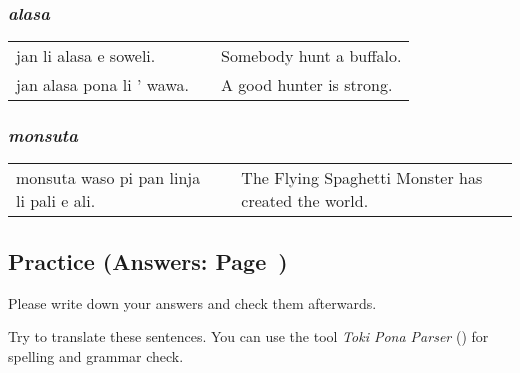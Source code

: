 \subsubsection*{\textit{alasa}}
\begin{supertabular}{p{5,5cm}|ll}
jan li alasa e soweli. && Somebody hunt a buffalo. \\
jan alasa pona li ' wawa. && A good hunter is strong. \\
\end{supertabular}

\subsubsection*{\textit{monsuta}}
\begin{supertabular}{p{5,5cm}|ll}
monsuta waso pi pan linja li pali e ali. &&  The Flying Spaghetti Monster has created the world. \\
\end{supertabular}

\newpage
\subsection*{Practice (Answers: Page~\pageref{'living_things'})}
%
Please write down your answers and check them afterwards. 

Try to translate these sentences. 
You can use the tool \textit{Toki Pona Parser} (\cite{www:rowa:02}) for spelling and grammar check. 

